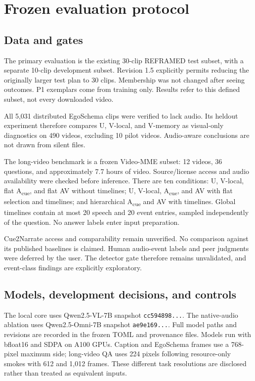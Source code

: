 \documentclass[10pt,twocolumn]{article}
\newcommand{\Acue}{A\textsubscript{cue}}
\begin{document}
\section{Frozen evaluation protocol}
\subsection{Data and gates}
The primary evaluation is the existing 30-clip REFRAMED test subset, with a separate 10-clip development subset. Revision 1.5 explicitly permits reducing the originally larger test plan to 30 clips. Membership was not changed after seeing outcomes. P1 exemplars come from training only. Results refer to this defined subset, not every downloaded video.

All 5,031 distributed EgoSchema clips were verified to lack audio. Its heldout experiment therefore compares U, V-local, and V-memory as visual-only diagnostics on 490 videos, excluding 10 pilot videos. Audio-aware conclusions are not drawn from silent files.

The long-video benchmark is a frozen Video-MME subset: 12 videos, 36 questions, and approximately 7.7 hours of video. Source/license access and audio availability were checked before inference. There are ten conditions: U, V-local, flat \Acue{}, and flat AV without timelines; U, V-local, \Acue{}, and AV with flat selection and timelines; and hierarchical \Acue{} and AV with timelines. Global timelines contain at most 20 speech and 20 event entries, sampled independently of the question. No answer labels enter input preparation.

Cue2Narrate access and comparability remain unverified. No comparison against its published baselines is claimed. Human audio-event labels and peer judgments were deferred by the user. The detector gate therefore remains unvalidated, and event-class findings are explicitly exploratory.

\subsection{Models, development decisions, and controls}
The local core uses Qwen2.5-VL-7B snapshot \texttt{cc594898...}. The native-audio ablation uses Qwen2.5-Omni-7B snapshot \texttt{ae9e169...}. Full model paths and revisions are recorded in the frozen TOML and provenance files. Models run with bfloat16 and SDPA on A100 GPUs. Caption and EgoSchema frames use a 768-pixel maximum side; long-video QA uses 224 pixels following resource-only smokes with 612 and 1,012 frames. These different task resolutions are disclosed rather than treated as equivalent inputs.
\end{document}

